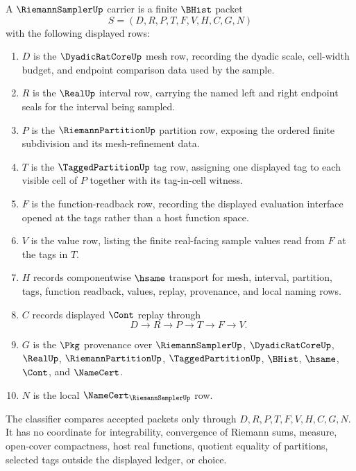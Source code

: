 \begin{definition}
\label{def:riemann-sampler-carrier}
A $\RiemannSamplerUp$ carrier is a finite $\BHist$ packet
$$
S=(D,R,P,T,F,V,H,C,G,N)
$$
with the following displayed rows:
\begin{enumerate}
\item $D$ is the $\DyadicRatCoreUp$ mesh row, recording the dyadic scale, cell-width budget, and endpoint comparison data used by the sample.
\item $R$ is the $\RealUp$ interval row, carrying the named left and right endpoint seals for the interval being sampled.
\item $P$ is the $\RiemannPartitionUp$ partition row, exposing the ordered finite subdivision and its mesh-refinement data.
\item $T$ is the $\TaggedPartitionUp$ tag row, assigning one displayed tag to each visible cell of $P$ together with its tag-in-cell witness.
\item $F$ is the function-readback row, recording the displayed evaluation interface opened at the tags rather than a host function space.
\item $V$ is the value row, listing the finite real-facing sample values read from $F$ at the tags in $T$.
\item $H$ records componentwise $\hsame$ transport for mesh, interval, partition, tags, function readback, values, replay, provenance, and local naming rows.
\item $C$ records displayed $\Cont$ replay through
$$
D\longrightarrow R\longrightarrow P\longrightarrow T\longrightarrow F\longrightarrow V .
$$
\item $G$ is the $\Pkg$ provenance over $\RiemannSamplerUp$, $\DyadicRatCoreUp$, $\RealUp$, $\RiemannPartitionUp$, $\TaggedPartitionUp$, $\BHist$, $\hsame$, $\Cont$, and $\NameCert$.
\item $N$ is the local $\NameCert_{\RiemannSamplerUp}$ row.
\end{enumerate}
The classifier compares accepted packets only through $D,R,P,T,F,V,H,C,G,N$. It has no coordinate for integrability, convergence of Riemann sums, measure, open-cover compactness, host real functions, quotient equality of partitions, selected tags outside the displayed ledger, or choice.
\end{definition}

